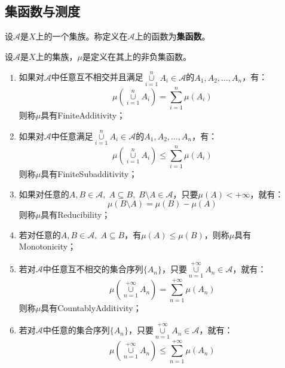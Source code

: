 \subsection{集函数与测度}
\begin{definition}
	设$\mathscr{A}$是$X$上的一个集族。称定义在$\mathscr{A}$上的函数为\textbf{集函数}。
\end{definition}
\begin{definition}
	设$\mathscr{A}$是$X$上的集族，$\mu$是定义在其上的非负集函数。
	\begin{enumerate}
		\item 如果对$\mathscr{A}$中任意互不相交并且满足$\underset{i=1}{\overset{n}{\cup}}A_i\in\mathscr{A}$的$A_1,A_2,\dots,A_n$，有：
		\begin{equation*}
			\mu\left(\underset{i=1}{\overset{n}{\cup}}A_i\right)=\sum_{i=1}^{n}\mu(A_i)
		\end{equation*}
		则称$\mu$具有\gls{FiniteAdditivity}；
		\item 如果对$\mathscr{A}$中任意满足$\underset{i=1}{\overset{n}{\cup}}A_i\in\mathscr{A}$的$A_1,A_2,\dots,A_n$，有：
		\begin{equation*}
			\mu\left(\underset{i=1}{\overset{n}{\cup}}A_i\right)\leqslant\sum_{i=1}^{n}\mu(A_i)
		\end{equation*}
		则称$\mu$具有\gls{FiniteSubadditivity}；
		\item 如果对任意的$A,B\in\mathscr{A},\;A\subseteq B,\;B\setminus A\in\mathscr{A}$，只要$\mu(A)<+\infty$，就有：
		\begin{equation*}
			\mu(B\setminus A)=\mu(B)-\mu(A)
		\end{equation*}
		则称$\mu$具有\gls{Reducibility}；
		\item 若对任意的$A,B\in\mathscr{A},\;A\subseteq B$，有$\mu(A)\leqslant\mu(B)$，则称$\mu$具有\gls{Monotonicity}；
		\item 若对$\mathscr{A}$中任意互不相交的集合序列$\{A_n\}$，只要$\underset{n=1}{\overset{+\infty}{\cup}}A_n\in\mathscr{A}$，就有：
		\begin{equation*}
			\mu\left(\underset{n=1}{\overset{+\infty}{\cup}}A_n\right)=\sum_{n=1}^{+\infty}\mu(A_n)
		\end{equation*}
		则称$\mu$具有\gls{CountablyAdditivity}；
		\item 若对$\mathscr{A}$中任意的集合序列$\{A_n\}$，只要$\underset{n=1}{\overset{+\infty}{\cup}}A_n\in\mathscr{A}$，就有：
		\begin{equation*}
			\mu\left(\underset{n=1}{\overset{+\infty}{\cup}}A_n\right)\leqslant\sum_{n=1}^{+\infty}\mu(A_n)

\end{equation*}
\end{enumerate}
\end{definition}

